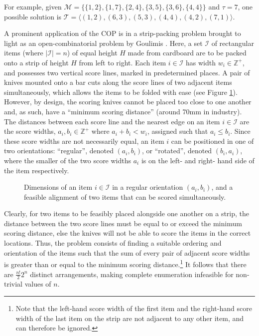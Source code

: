 \documentclass[runningheads]{llncs}
\begin{document}
For example, given $\mathcal{M} = \{\{1,2\}, \{1,7\}, \{2,4\}, \{3,5\}, \{3,6\}, \{4,4\}\}$ and $\tau = 7$, one possible solution is $\mathcal{T} = \langle(1,2), (6,3), (5,3), (4,4), (4,2), (7,1) \rangle$.

A prominent application of the COP is in a strip-packing problem brought to light as an open-combinatorial problem by Goulimis \cite{goulimis2004}. Here, a set $\mathcal{I}$ of rectangular items (where $|\mathcal{I}| = n$) of equal height $H$ made from cardboard are to be packed onto a strip of height $H$ from left to right. Each item $i \in \mathcal{I}$ has width $w_i \in \mathbb{Z}^{+}$, and possesses two vertical score lines, marked in predetermined places. A pair of knives mounted onto a bar cuts along the score lines of two adjacent items simultaneously, which allows the items to be folded with ease (see Figure \ref{fig:itemsknife}). However, by design, the scoring knives cannot be placed too close to one another and, as such, have a ``minimum scoring distance'' (around 70mm in industry). The distances between each score line and the nearest edge on an item $i \in \mathcal{I}$ are the score widths, $a_i, b_i \in \mathbb{Z}^{+}$ where $a_i + b_i < w_i$, assigned such that $a_i \leq b_i$. Since these score widths are not necessarily equal, an item $i$ can be positioned in one of two orientations: ``regular'', denoted $(a_i, b_i)$, or ``rotated'', denoted $(b_i, a_i)$, where the smaller of the two score widths $a_i$ is on the left- and right- hand side of the item respectively. 
\begin{figure}[H]	
	\centering
	
	\caption{Dimensions of an item $i \in \mathcal{I}$ in a regular orientation $(a_i, b_i)$, and a feasible alignment of two items that can be scored simultaneously.}	
	\label{fig:itemsknife}
\end{figure}
Clearly, for two items to be feasibly placed alongside one another on a strip, the distance between the two score lines must be equal to or exceed the minimum scoring distance, else the knives will not be able to score the items in the correct locations. Thus, the problem consists of finding a suitable ordering and orientation of the items such that the sum of every pair of adjacent score widths is greater than or equal to the minimum scoring distance.\footnote{Note that the left-hand score width of the first item and the right-hand score width of the last item on the strip are not adjacent to any other item, and can therefore be ignored.} It follows that there are $\frac{n!}{2}2^n$ distinct arrangements, making complete enumeration infeasible for non-trivial values of $n$.
\end{document}
